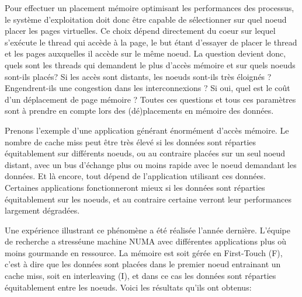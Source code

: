     Pour effectuer un placement mémoire optimisant les performances des
    processus, le système d'exploitation doit donc être capable de sélectionner
    sur quel noeud placer les pages virtuelles. Ce choix dépend directement du
    coeur sur lequel s'exécute le thread qui accède à la page, le but étant
    d'essayer de placer le thread et les pages auxquelles il accède sur le même
    noeud. La question devient donc, quels sont les threads qui demandent le
    plus d’accès mémoire et sur quels noeuds sont-ils placés?
    Si les accès sont distants, les noeuds sont-ils très éloignés ?
    Engendrent-ils une congestion dans les interconnexions ? Si oui, quel est le
    coût d'un déplacement de page mémoire ? Toutes ces questions et tous ces
    paramètres sont à prendre en compte lors des (dé)placements en mémoire des
    données.

    Prenons l'exemple d'une application générant énormément d'accès mémoire. Le
    nombre de cache miss peut être très élevé si les données sont réparties
    équitablement sur différents noeuds, ou au contraire placées sur un seul
    noeud distant, avec un bus d'échange plus ou moins rapide avec le noeud
    demandant les données. Et là encore, tout dépend de l'application utilisant
    ces données. Certaines applications fonctionneront mieux si les données sont
    réparties équitablement sur les noeuds, et au contraire certaine verront
    leur performances largement dégradées.

    Une expérience illustrant ce phénomène a été réalisée l'année
    dernière\cite{Holistic2013}. L'équipe de recherche a \og stressé\fg une
    machine NUMA avec différentes applications plus où moins gourmande en
    ressource. La mémoire est soit gérée en \og First-Touch (F)\fg, c'est à dire
    que les données sont placées dans le premier noeud entrainant un cache miss,
    soit en \og interleaving (I)\fg, et dans ce cas les données sont réparties
    équitablement entre les noeuds. Voici les résultats qu'ils ont obtenus:

